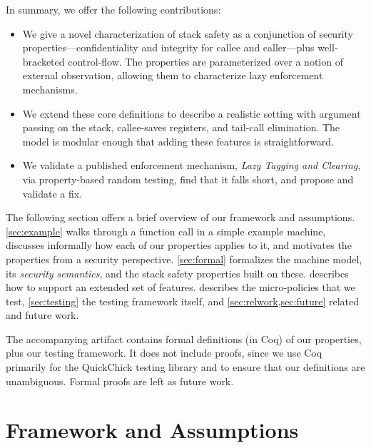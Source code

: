 \documentclass[10pt,conference]{ieeetran}%
\theoremstyle{definition}
\begin{document}
In summary, we offer the following contributions:

\begin{itemize}
\item We give a novel characterization of stack safety as a conjunction
  of security properties---confidentiality and integrity for callee
  and caller---plus well-bracketed control-flow.
  The properties are parameterized over a notion of
  external observation, allowing them to characterize lazy enforcement
  mechanisms.
\item We extend these core definitions to
  describe a realistic setting with argument passing on the stack,
  callee-saves registers, and tail-call elimination. The model is
  modular enough that adding these features is straightforward.
\item We validate a published enforcement mechanism, \emph{Lazy
  Tagging and Clearing}, via property-based random testing, find that
it falls short, and propose and validate a fix.
\end{itemize}
%
The following section offers a brief overview of our framework and
assumptions. \cref{sec:example} walks through a function call in
a simple example machine, discusses informally how each of our properties
applies to it, and motivates the properties
from a security perspective.
%
\cref{sec:formal} formalizes the machine model,
its {\em security semantics}, and the stack safety properties built on these.
 describes how to support an extended set of features.
 describes the micro-policies that we test,
\cref{sec:testing} the testing framework itself, and
\cref{sec:relwork,sec:future} related and future work.

The accompanying artifact  
contains formal definitions (in Coq) of our
properties, plus our testing framework.  It does not include proofs, since
we use Coq primarily for the QuickChick testing library and to
ensure that our definitions are unambiguous.  Formal proofs are left
as future work.

\section{Framework and Assumptions}
\label{sec:ideas}
\end{document}
